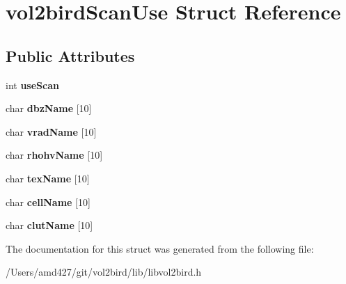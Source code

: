 \hypertarget{structvol2birdScanUse}{}\section{vol2bird\+Scan\+Use Struct Reference}
\label{structvol2birdScanUse}
\subsection*{Public Attributes}
\begin{DoxyCompactItemize}
\item 
\mbox{\label{structvol2birdScanUse_a5af4c6d914d381865b1e7ee9267a0d7f}} 
int {\bfseries use\+Scan}
\item 
\mbox{\label{structvol2birdScanUse_a312616755a7314a0d2b106a57c1b289c}} 
char {\bfseries dbz\+Name} \mbox{[}10\mbox{]}
\item 
\mbox{\label{structvol2birdScanUse_aacaac1fcd154c9d1fdbfc897253aff6e}} 
char {\bfseries vrad\+Name} \mbox{[}10\mbox{]}
\item 
\mbox{\label{structvol2birdScanUse_a14ddc8906890dd32f16db660631de05a}} 
char {\bfseries rhohv\+Name} \mbox{[}10\mbox{]}
\item 
\mbox{\label{structvol2birdScanUse_a28c9e02d1bbe77694cef7847ea46456a}} 
char {\bfseries tex\+Name} \mbox{[}10\mbox{]}
\item 
\mbox{\label{structvol2birdScanUse_a1ddfae4c0bfc7b9af4b587fedc59e8ea}} 
char {\bfseries cell\+Name} \mbox{[}10\mbox{]}
\item 
\mbox{\label{structvol2birdScanUse_ac2ae9e299ba88d9e3577e296c77545d0}} 
char {\bfseries clut\+Name} \mbox{[}10\mbox{]}
\end{DoxyCompactItemize}


The documentation for this struct was generated from the following file\+:\begin{DoxyCompactItemize}
\item 
/\+Users/amd427/git/vol2bird/lib/libvol2bird.\+h\end{DoxyCompactItemize}
